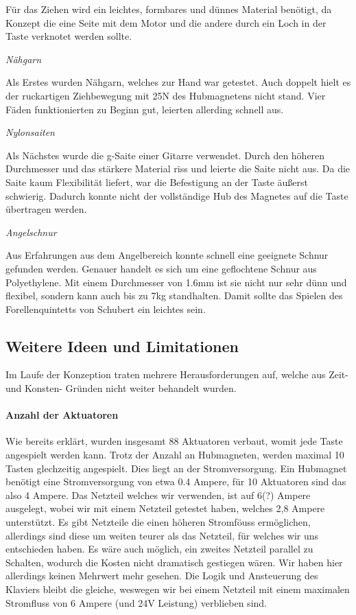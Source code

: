 Für das Ziehen wird ein leichtes, formbares und dünnes Material benötigt, da Konzept die eine Seite mit dem Motor und die andere durch ein Loch in der Taste verknotet werden sollte.

\textit{Nähgarn}

Als Erstes wurden Nähgarn, welches zur Hand war getestet.
Auch doppelt hielt es der ruckartigen Ziehbewegung mit 25N des Hubmagnetens nicht stand.
Vier Fäden funktionierten zu Beginn gut, leierten allerding schnell aus.

\textit{Nylonsaiten}

Als Nächstes wurde die g-Saite einer Gitarre verwendet.
Durch den höheren Durchmesser und das stärkere Material riss und leierte die Saite nicht aus.
Da die Saite kaum Flexibilität liefert, war die Befestigung an der Taste äußerst schwierig.
Dadurch konnte nicht der vollständige Hub des Magnetes auf die Taste übertragen werden.

\textit{Angelschnur}

Aus Erfahrungen aus dem Angelbereich konnte schnell eine geeignete Schnur gefunden werden.
Genauer handelt es sich um eine geflochtene Schnur aus Polyethylene.
Mit einem Durchmesser von 1.6mm ist sie nicht nur sehr dünn und flexibel, sondern kann auch bis zu 7kg standhalten.
Damit sollte das Spielen des Forellenquintetts von Schubert ein leichtes sein.



\subsection{Weitere Ideen und Limitationen}

Im Laufe der Konzeption traten mehrere Herausforderungen auf, welche aus Zeit- und Konsten- Gründen nicht weiter
behandelt wurden.
\paragraph{Anzahl der Aktuatoren}
Wie bereits erklärt, wurden insgesamt 88 Aktuatoren verbaut, womit jede Taste angespielt werden kann. Trotz der Anzahl an
Hubmagneten, werden maximal 10 Tasten glechzeitig angespielt. Dies liegt an der Stromversorgung. Ein Hubmagnet benötigt
eine Stromversorgung von etwa 0.4 Ampere, für 10 Aktuatoren sind das also 4 Ampere. Das Netzteil welches wir verwenden, ist auf
6(?) Ampere ausgelegt, wobei wir mit einem Netzteil getestet haben, welches 2,8 Ampere unterstützt. Es gibt Netzteile die
einen höheren Stromföuss ermöglichen, allerdings sind diese um weiten teurer als das Netzteil, für welches wir uns entschieden haben.
Es wäre auch möglich, ein zweites Netzteil parallel zu Schalten, wodurch die Kosten nicht dramatisch gestiegen wären.
Wir haben hier allerdings keinen Mehrwert mehr gesehen. Die Logik und Ansteuerung des Klaviers bleibt die gleiche, weswegen
wir bei einem Netzteil mit einem maximalen Stromfluss von 6 Ampere (und 24V Leistung) verblieben sind.

